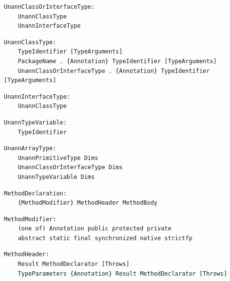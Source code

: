 \noindent\textbf{\texttt{}}\par
\begin{lstlisting}
UnannClassOrInterfaceType:
    UnannClassType
    UnannInterfaceType
\end{lstlisting}

\noindent\textbf{\texttt{}}\par
\begin{lstlisting}
UnannClassType:
    TypeIdentifier [TypeArguments]
    PackageName . {Annotation} TypeIdentifier [TypeArguments]
    UnannClassOrInterfaceType . {Annotation} TypeIdentifier [TypeArguments]
\end{lstlisting}

\noindent\textbf{\texttt{}}\par
\begin{lstlisting}
UnannInterfaceType:
    UnannClassType
\end{lstlisting}

\noindent\textbf{\texttt{}}\par
\begin{lstlisting}
UnannTypeVariable:
    TypeIdentifier
\end{lstlisting}

\noindent\textbf{\texttt{}}\par
\begin{lstlisting}
UnannArrayType:
    UnannPrimitiveType Dims
    UnannClassOrInterfaceType Dims
    UnannTypeVariable Dims
\end{lstlisting}

\noindent\textbf{\texttt{}}\par
\begin{lstlisting}
MethodDeclaration:
    {MethodModifier} MethodHeader MethodBody
\end{lstlisting}

\noindent\textbf{\texttt{}}\par
\begin{lstlisting}
MethodModifier:
    (one of) Annotation public protected private
    abstract static final synchronized native strictfp
\end{lstlisting}

\noindent\textbf{\texttt{}}\par
\begin{lstlisting}
MethodHeader:
    Result MethodDeclarator [Throws]
    TypeParameters {Annotation} Result MethodDeclarator [Throws]
\end{lstlisting}

